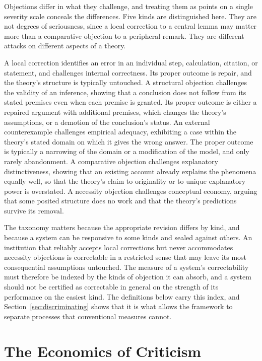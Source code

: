 \documentclass[11pt]{article}
\theoremstyle{remark}
\begin{document}
Objections differ in what they challenge, and treating them as points on a single severity scale conceals the differences. Five kinds are distinguished here. They are not degrees of seriousness, since a local correction to a central lemma may matter more than a comparative objection to a peripheral remark. They are different attacks on different aspects of a theory.

A local correction identifies an error in an individual step, calculation, citation, or statement, and challenges internal correctness. Its proper outcome is repair, and the theory's structure is typically untouched. A structural objection challenges the validity of an inference, showing that a conclusion does not follow from its stated premises even when each premise is granted. Its proper outcome is either a repaired argument with additional premises, which changes the theory's assumptions, or a demotion of the conclusion's status. An external counterexample challenges empirical adequacy, exhibiting a case within the theory's stated domain on which it gives the wrong answer. The proper outcome is typically a narrowing of the domain or a modification of the model, and only rarely abandonment. A comparative objection challenges explanatory distinctiveness, showing that an existing account already explains the phenomena equally well, so that the theory's claim to originality or to unique explanatory power is overstated. A necessity objection challenges conceptual economy, arguing that some posited structure does no work and that the theory's predictions survive its removal.

The taxonomy matters because the appropriate revision differs by kind, and because a system can be responsive to some kinds and sealed against others. An institution that reliably accepts local corrections but never accommodates necessity objections is correctable in a restricted sense that may leave its most consequential assumptions untouched. The measure of a system's correctability must therefore be indexed by the kinds of objection it can absorb, and a system should not be certified as correctable in general on the strength of its performance on the easiest kind. The definitions below carry this index, and Section~\ref{sec:discriminating} shows that it is what allows the framework to separate processes that conventional measures cannot.

\section{The Economics of Criticism}
\label{sec:econ}
\end{document}

